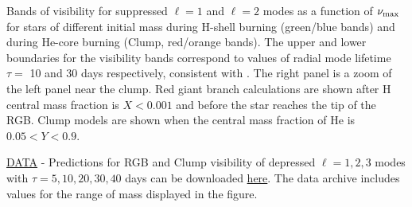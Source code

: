 \label{fig:visibility} Bands of visibility for suppressed $\ell=1$ and $\ell=2$ modes as a function of $\nu_{\rm max}$ for stars of different initial mass during H-shell burning (green/blue bands) and during He-core burning (Clump, red/orange bands). The upper and lower boundaries for the visibility bands correspond to values of radial mode lifetime $\tau=$ 10 and 30 days respectively, consistent with \citet{Dupret_2009,Corsaro_2015}. The right panel is a zoom of the left panel near the clump. Red giant branch calculations are shown after H central mass fraction is $ X < 0.001$ and before the star reaches the tip of the RGB. Clump models are shown when the central mass fraction of He is $0.05 < Y < 0.9$.

\href{https://www.authorea.com/users/2/articles/38219/master/file/figures/integral_stack1/Data.zip}{DATA} - Predictions for RGB and Clump visibility of depressed $\ell=1,2,3$ modes with $\tau=5,10,20,30,40$ days can be downloaded \href{https://www.authorea.com/users/2/articles/38219/master/file/figures/integral_stack1/Data.zip}{here}. The data archive includes values for the range of mass displayed in the figure.


  
  
  